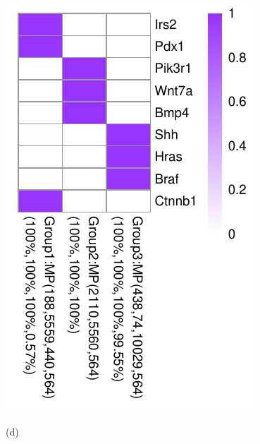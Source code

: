 \documentclass{bmcart}
\begin{document}
\begin{figure}[!h]
\begin{minipage}{.3\linewidth}
   \includegraphics[width=\linewidth]{DrawPictures/v3.pdf}
    \centerline{(d)}
  \end{minipage}
  \hfil
  \begin{minipage}{.3\linewidth}

\end{minipage}
\end{figure}
\end{document}
